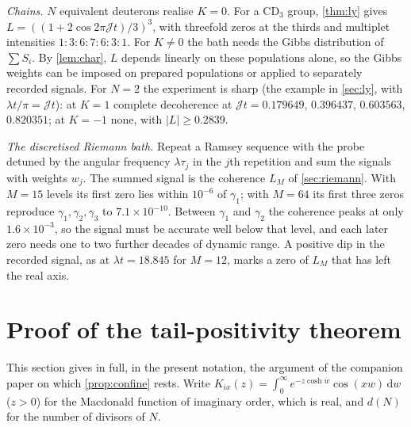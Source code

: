 \documentclass[11pt]{article}
\theoremstyle{definition}\newtheorem{definition}[theorem]{Definition}
\theoremstyle{remark}\newtheorem{remark}[theorem]{Remark}
\newcommand{\dd}{\,\mathrm d}\newcommand{\e}{\mathrm e}
\begin{document}
\emph{Chains.} $N$ equivalent deuterons realise $K=0$. For a CD$_3$ group, \cref{thm:ly} gives $L=((1+2\cos2\pi\mathcal Jt)/3)^3$, with threefold zeros at the thirds and multiplet intensities $1{:}3{:}6{:}7{:}6{:}3{:}1$. For $K\ne0$ the bath needs the Gibbs distribution of $\sum S_i$. By \cref{lem:char}, $L$ depends linearly on these populations alone, so the Gibbs weights can be imposed on prepared populations or applied to separately recorded signals. For $N=2$ the experiment is sharp (the example in \cref{sec:ly}, with $\lambda t/\pi=\mathcal Jt$): at $K=1$ complete decoherence at $\mathcal Jt=0.179649$, $0.396437$, $0.603563$, $0.820351$; at $K=-1$ none, with $|L|\ge0.2839$.

\emph{The discretised Riemann bath.} Repeat a Ramsey sequence with the probe detuned by the angular frequency $\lambda\tau_j$ in the $j$th repetition and sum the signals with weights $w_j$. The summed signal is the coherence $L_M$ of \cref{sec:riemann}. With $M=15$ levels its first zero lies within $10^{-6}$ of $\gamma_1$; with $M=64$ its first three zeros reproduce $\gamma_1,\gamma_2,\gamma_3$ to $7.1\times10^{-10}$. Between $\gamma_1$ and $\gamma_2$ the coherence peaks at only $1.6\times10^{-3}$, so the signal must be accurate well below that level, and each later zero needs one to two further decades of dynamic range. A positive dip in the recorded signal, as at $\lambda t=18.845$ for $M=12$, marks a zero of $L_M$ that has left the real axis.

\section{Proof of the tail-positivity theorem}\label{sec:tail}
This section gives in full, in the present notation, the argument of the companion paper \cite{SMath} on which \cref{prop:confine} rests. Write $K_{ix}(z)=\int_0^\infty e^{-z\cosh w}\cos(xw)\dd w$ ($z>0$) for the Macdonald function of imaginary order, which is real, and $d(N)$ for the number of divisors of $N$.
\end{document}
